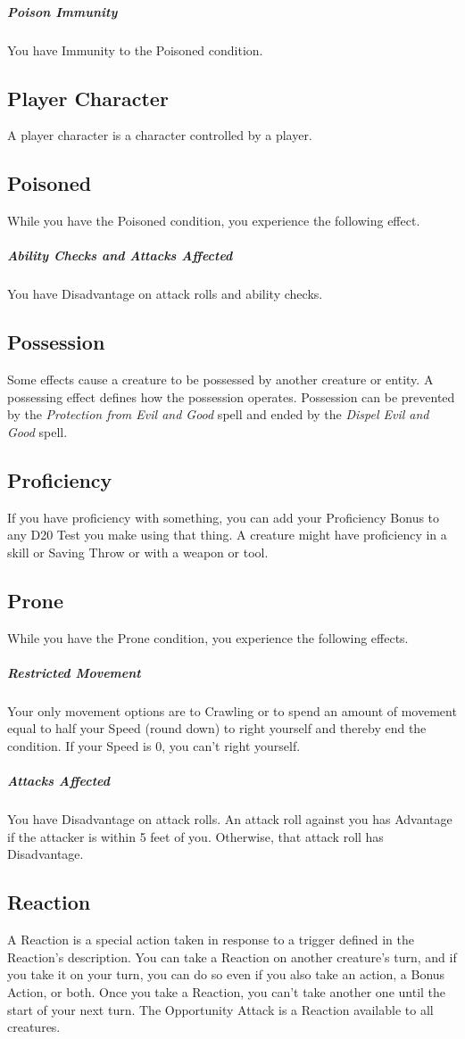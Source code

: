 \documentclass[10pt,a4paper,twoside,bg=print,twocolumn,openany,nodeprecatedcode]{dndarticle}
\begin{document}
\subparagraph{Poison Immunity}
You have Immunity to the Poisoned condition.

\subsection{Player Character}
A player character is a character controlled by a player.

\subsection{Poisoned}
While you have the Poisoned condition, you experience the following effect.

\subparagraph{Ability Checks and Attacks Affected}
You have Disadvantage on attack rolls and ability checks.

\subsection{Possession}
Some effects cause a creature to be possessed by another creature or entity. A possessing effect defines how the possession operates. Possession can be prevented by the \textit{Protection from Evil and Good} spell and ended by the \textit{Dispel Evil and Good} spell.

\subsection{Proficiency}
If you have proficiency with something, you can add your Proficiency Bonus to any D20 Test you make using that thing. A creature might have proficiency in a skill or Saving Throw or with a weapon or tool.

\subsection{Prone}
While you have the Prone condition, you experience the following effects.

\subparagraph{Restricted Movement}
Your only movement options are to Crawling or to spend an amount of movement equal to half your Speed (round down) to right yourself and thereby end the condition. If your Speed is 0, you can't right yourself.

\subparagraph{Attacks Affected}
You have Disadvantage on attack rolls. An attack roll against you has Advantage if the attacker is within 5 feet of you. Otherwise, that attack roll has Disadvantage.

\subsection{Reaction}
A Reaction is a special action taken in response to a trigger defined in the Reaction's description. You can take a Reaction on another creature's turn, and if you take it on your turn, you can do so even if you also take an action, a Bonus Action, or both. Once you take a Reaction, you can't take another one until the start of your next turn. The Opportunity Attack is a Reaction available to all creatures.
\end{document}
